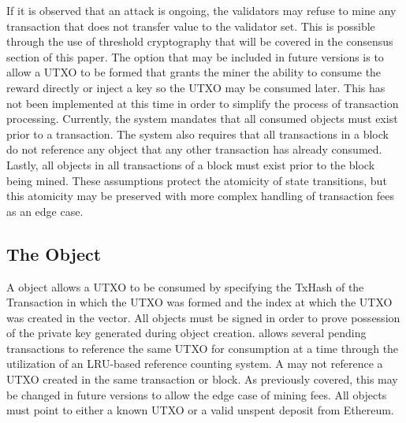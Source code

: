 If it is observed that an attack is ongoing, the validators may refuse
to mine any transaction that does not transfer value to the validator
set.
This is possible through the use of threshold cryptography that will be
covered in the consensus section of this paper.
The option that may be included in future versions is to allow a UTXO
to be formed that grants the miner the ability to consume the reward
directly or inject a key so the UTXO may be consumed later.
This has not been implemented at this time in order to simplify the
process of transaction processing.
Currently, the system mandates that all consumed objects must exist
prior to a transaction.
The system also requires that all transactions in a block do not
reference any object that any other transaction has already consumed.
Lastly, all objects in all transactions of a block must exist prior to
the block being mined.
These assumptions protect the atomicity of state transitions, but this
atomicity may be preserved with more complex handling of transaction
fees as an edge case.


\subsection{The \TxIn{} Object}



A \TxIn{} object allows a UTXO to be consumed by specifying the TxHash of
the Transaction in which the UTXO was formed and the index at which the
UTXO was created in the \Vout{} vector.
All \TxIn{} objects must be signed in order to prove possession of the
private key generated during object creation.
\LayerTwo{} allows several pending transactions to reference the same
UTXO for consumption at a time through the utilization of an LRU-based
reference counting system.
A \TxIn{} may not reference a UTXO created in the same transaction or
block.
As previously covered, this may be changed in future versions to allow
the edge case of mining fees.
All \TxIn{} objects must point to either a known UTXO or a valid unspent
deposit from Ethereum.

